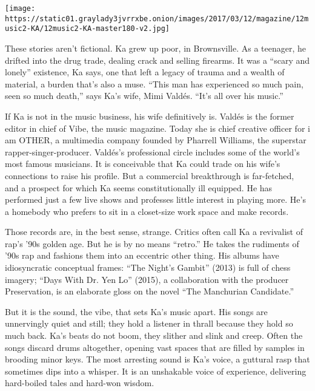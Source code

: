 \texttt{[image: https://static01.graylady3jvrrxbe.onion/images/2017/03/12/magazine/12music2-KA/12music2-KA-master180-v2.jpg]}

These stories aren't fictional. Ka grew up poor, in Brownsville. As a
teenager, he drifted into the drug trade, dealing crack and selling
firearms. It was a ``scary and lonely'' existence, Ka says, one that
left a legacy of trauma and a wealth of material, a burden that's also a
muse. ``This man has experienced so much pain, seen so much death,''
says Ka's wife, Mimi Valdés. ``It's all over his music.''

If Ka is not in the music business, his wife definitively is. Valdés is
the former editor in chief of Vibe, the music magazine. Today she is
chief creative officer for i am OTHER, a multimedia company founded by
Pharrell Williams, the superstar rapper-singer-producer. Valdés's
professional circle includes some of the world's most famous musicians.
It is conceivable that Ka could trade on his wife's connections to raise
his profile. But a commercial breakthrough is far-fetched, and a
prospect for which Ka seems constitutionally ill equipped. He has
performed just a few live shows and professes little interest in playing
more. He's a homebody who prefers to sit in a closet-size work space and
make records.

Those records are, in the best sense, strange. Critics often call Ka a
revivalist of rap's '90s golden age. But he is by no means ``retro.'' He
takes the rudiments of '90s rap and fashions them into an eccentric
other thing. His albums have idiosyncratic conceptual frames: ``The
Night's Gambit'' (2013) is full of chess imagery; ``Days With Dr. Yen
Lo'' (2015), a collaboration with the producer Preservation, is an
elaborate gloss on the novel ``The Manchurian Candidate.''

But it is the sound, the vibe, that sets Ka's music apart. His songs are
unnervingly quiet and still; they hold a listener in thrall because they
hold so much back. Ka's beats do not boom, they slither and slink and
creep. Often the songs discard drums altogether, opening vast spaces
that are filled by samples in brooding minor keys. The most arresting
sound is Ka's voice, a guttural rasp that sometimes dips into a whisper.
It is an unshakable voice of experience, delivering hard-boiled tales
and hard-won wisdom.

\hypertarget{-4}{%
\subsection{}\label{-4}}

